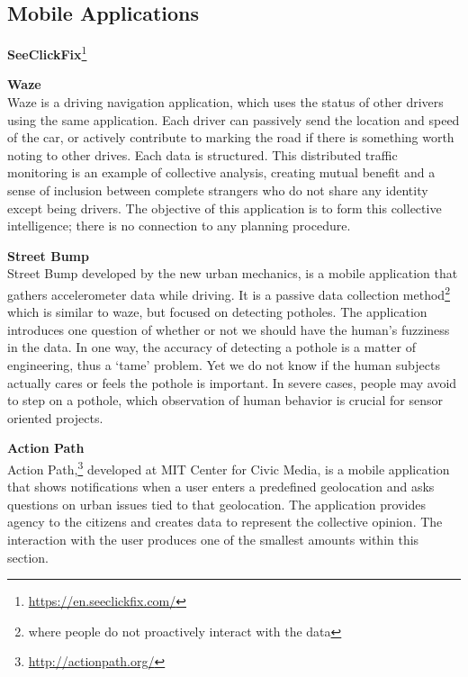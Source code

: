 \subsection{Mobile Applications}

\textbf{SeeClickFix}\footnote{\url{https://en.seeclickfix.com/}}\\

\textbf{Waze}\\
Waze is a driving navigation application, which uses the status of other drivers using the same application. Each driver can passively send the location and speed of the car, or actively contribute to marking the road if there is something worth noting to other drives. Each data is structured. This distributed traffic monitoring is an example of collective analysis, creating mutual benefit and a sense of inclusion between complete strangers who do not share any identity except being drivers. The objective of this application is to form this collective intelligence; there is no connection to any planning procedure.

\textbf{Street Bump} \\
Street Bump developed by the new urban mechanics, is a mobile application that gathers accelerometer data while driving. It is a passive data collection method\footnote{where people do not proactively interact with the data} which is similar to waze, but focused on detecting potholes. The application introduces one question of whether or not we should have the human's fuzziness in the data. In one way, the accuracy of detecting a pothole is a matter of engineering, thus a `tame' problem. Yet we do not know if the human subjects actually cares or feels the pothole is important. In severe cases, people may avoid to step on a pothole, which observation of human behavior is crucial for sensor oriented projects. 
\cite{o2013exploiting}

\textbf{Action Path}\\
Action Path,\footnote{\url{http://actionpath.org/}} \cite{graeff2014crowdsourcing} developed at MIT Center for Civic Media, is a mobile application that shows notifications when a user enters a predefined geolocation and asks questions on urban issues tied to that geolocation. The application provides agency to the citizens and creates data to represent the collective opinion. The interaction with the user produces one of the smallest amounts within this section.

